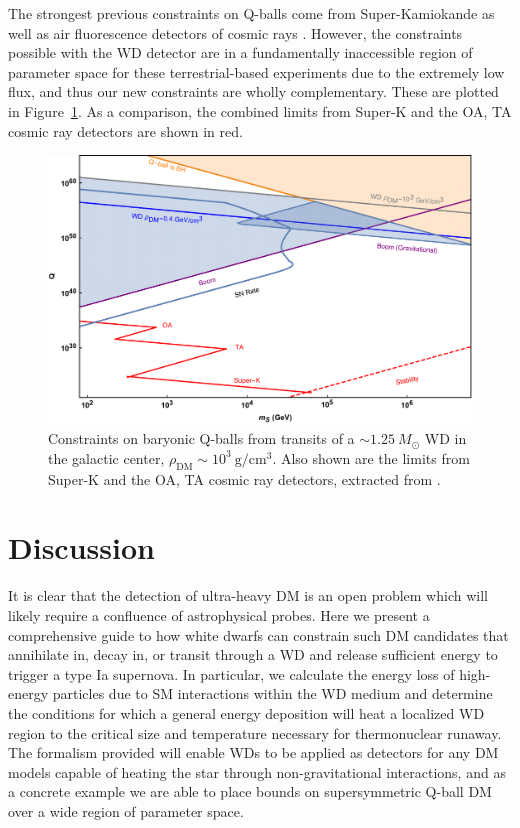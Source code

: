 \documentclass[twocolumn, preprintnumbers,amsmath,amssymb,prd, superscriptaddress]{revtex4}
\begin{document}
The strongest previous constraints on Q-balls come from Super-Kamiokande as well as air fluorescence detectors of cosmic rays \cite{Dine:2003ax}.
However, the constraints possible with the WD detector are in a fundamentally inaccessible region of parameter space for these terrestrial-based experiments due to the extremely low flux, and thus our new constraints are wholly complementary.
These are plotted in Figure~\ref{fig:Qballconstraint}.
As a comparison, the combined limits from Super-K and the OA, TA cosmic ray detectors are shown in red.
\begin{figure}
\includegraphics[scale=.3]{Qballconstraint.pdf}
\caption{Constraints on baryonic Q-balls from transits of a $\sim 1.25 ~M_{\odot}$ WD in the galactic center, $\rho_\text{DM} \sim 10^3 ~\text{g}/\text{cm}^3$. Also shown are the limits from Super-K and the OA, TA cosmic ray detectors, extracted from \cite{Dine:2003ax}.}
\label{fig:Qballconstraint}
\end{figure}

\section{Discussion}
\label{sec:Discussion}

It is clear that the detection of ultra-heavy DM is an open problem which will likely require a confluence of astrophysical probes.
Here we present a comprehensive guide to how white dwarfs can constrain such DM candidates that annihilate in, decay in, or transit through a WD and release sufficient energy to trigger a type Ia supernova.
In particular, we calculate the energy loss of high-energy particles due to SM interactions within the WD medium and determine the conditions for which a general energy deposition will heat a localized WD region to the critical size and temperature necessary for thermonuclear runaway.
The formalism provided will enable WDs to be applied as detectors for any DM models capable of heating the star through non-gravitational interactions, and as a concrete example we are able to place bounds on supersymmetric Q-ball DM over a wide region of parameter space.
\end{document}
